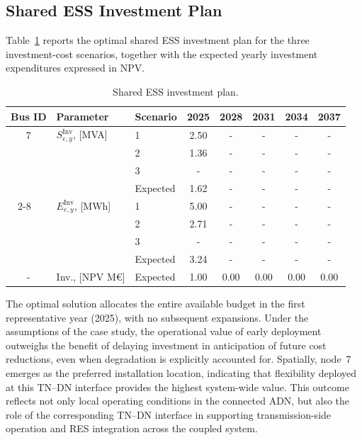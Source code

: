 \documentclass[preprint,12pt]{elsarticle}
\begin{document}
\subsection{Shared ESS Investment Plan}
\label{subsec:cs3_shared_ess_investment_plan}

Table~\ref{tab:cs3_shared_ess_investment_plan} reports the optimal shared ESS investment plan for the three investment-cost scenarios, together with the expected yearly investment expenditures expressed in NPV.

\begin{table}[htbp!]
    \centering
    \caption{Shared ESS investment plan.}
    \begin{tabular}{cll ccccc}
        \toprule
        Bus ID & Parameter                 & Scenario & 2025 & 2028 & 2031 & 2034 & 2037 \\ 
        \midrule
        7 & $S^{\text{Inv}}_{e,y}$, [MVA]  & 1          & 2.50  & - & - & - & - \\ 
        ~ & ~                              & 2          & 1.36  & - & - & - & - \\ 
        ~ & ~                              & 3          & -     & - & - & - & - \\ 
        ~ & ~                              & Expected   & 1.62  & - & - & - & - \\ \cmidrule{2-8}
        ~ & $E^{\text{Inv}}_{e,y}$, [MWh]  & 1          & 5.00  & - & - & - & - \\ 
        ~ & ~                              & 2          & 2.71  & - & - & - & - \\ 
        ~ & ~                              & 3          & -     & - & - & - & - \\ 
        ~ & ~                              & Expected   & 3.24  & - & - & - & - \\ 
        \midrule
        - & Inv., [NPV M\euro]             & Expected   & 1.00  & 0.00  & 0.00 & 0.00 & 0.00 \\
        \bottomrule
    \end{tabular}
    \label{tab:cs3_shared_ess_investment_plan}
\end{table}

The optimal solution allocates the entire available budget in the first representative year (2025), with no subsequent expansions. Under the assumptions of the case study, the operational value of early deployment outweighs the benefit of delaying investment in anticipation of future cost reductions, even when degradation is explicitly accounted for.
Spatially, node~7 emerges as the preferred installation location, indicating that flexibility deployed at this TN--DN interface provides the highest system-wide value. 
This outcome reflects not only local operating conditions in the connected ADN, but also the role of the corresponding TN--DN interface in supporting transmission-side operation and RES integration across the coupled system.
\end{document}
